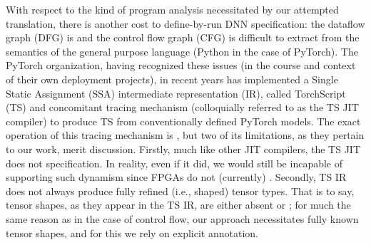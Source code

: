 With respect to the kind of program analysis necessitated by our attempted translation, there is another cost to define-by-run DNN specification: the dataflow graph (DFG) is  and the control flow graph (CFG) is difficult to extract from the semantics of the general purpose language (Python in the case of PyTorch).
The PyTorch organization, having recognized these issues (in the course and context of their own deployment projects), in recent years has implemented a Single Static Assignment (SSA) intermediate representation (IR), called TorchScript (TS) and concomitant tracing mechanism (colloquially referred to as the TS JIT compiler) to produce TS from conventionally defined PyTorch models.
The exact operation of this tracing mechanism is , but two of its limitations, as they pertain to our work, merit discussion.
Firstly, much like other JIT compilers, the TS JIT does not specification.
In reality, even if it did, we would still be incapable of supporting such dynamism since FPGAs do not (currently) .
Secondly, TS IR does not always produce fully refined (i.e., shaped) tensor types.
That is to say, tensor shapes, as they appear in the TS IR, are either absent or ; for much the same reason as in the case of control flow, our approach necessitates fully known tensor shapes, and for this we rely on explicit annotation.


